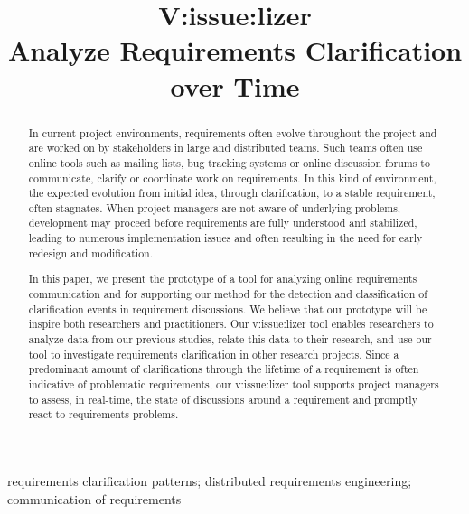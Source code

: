 
\title{V:issue:lizer\\Analyze Requirements Clarification over Time}


\author{
}

\maketitle


\begin{abstract}
In current project environments, requirements often evolve throughout the project and are worked on by stakeholders in large and distributed teams. 
Such teams often use online tools such as mailing lists, bug tracking systems or online discussion forums to communicate, clarify or coordinate work on requirements. 
In this kind of environment, the expected evolution from initial idea, through clarification, to a stable requirement, often stagnates. 
When project managers are not aware of underlying problems, development may proceed before requirements are fully understood and stabilized, leading to numerous implementation issues and often resulting in the need for early redesign and modification.

In this paper, we present the prototype of a tool for analyzing online requirements communication and for supporting our method for the detection and classification of clarification events in requirement discussions. 
We believe that our prototype will be inspire both researchers and practitioners. 
Our v:issue:lizer tool enables researchers to analyze data from our previous studies, relate this data to their research, and use our tool to investigate requirements clarification in other research projects. 
Since a predominant amount of clarifications through the lifetime of a requirement is often indicative of problematic requirements, our v:issue:lizer tool supports project managers to assess, in real-time, the state of discussions around a requirement and promptly react to requirements problems.
\end{abstract}

\begin{IEEEkeywords}
requirements clarification patterns; distributed requirements engineering; communication of requirements
\end{IEEEkeywords}
